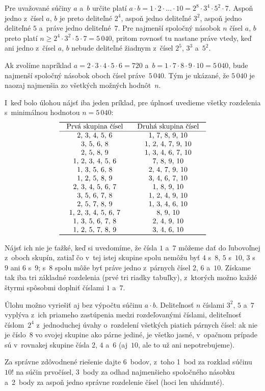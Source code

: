 {%
Pre uvažované súčiny $a$ a~$b$ určite platí $a\cdot b=1\cdot2\cdot\dots\cdot10
= 2^8\cdot3^4\cdot5^2\cdot7$. Aspoň
jedno z~čísel $a$, $b$ je preto deliteľné $2^4$, aspoň jedno deliteľné
$3^2$, aspoň jedno deliteľné $5$ a~práve jedno deliteľné~$7$. Pre najmenší
spoločný násobok $n$ čísel $a$, $b$ preto platí $n\ge2^4\cdot3^2\cdot5\cdot7 = 5\,040$,
pritom rovnosť tu nastane práve vtedy, keď ani jedno z~čísel
$a$, $b$ nebude deliteľné žiadnym z~čísel $2^5$, $3^3$ a~$5^2$.

Ak zvolíme napríklad $a = 2\cdot3\cdot4\cdot5\cdot6 = 720$
a~$b = 1\cdot7\cdot8\cdot9\cdot10 = 5\,040$, bude najmenší spoločný násobok oboch
čísel práve~$5\,040$.
Tým je ukázané, že $5\,040$ je naozaj najmenšia zo všetkých možných hodnôt~$n$.

I~keď bolo úlohou nájsť iba jeden príklad, pre úplnosť uvedieme všetky
rozdelenia s~minimálnou hodnotou $n=5\,040$:
$$
\vbox{\let\\=\cr
\halign{&\quad\hss\strut#\unskip\hss\quad\cr \noalign{\hrule height.8pt}
Prvá skupina čísel & Druhá skupina čísel \\ \noalign{\hrule height.4pt}
2, 3, 4, 5, 6 & 1, 7, 8, 9, 10 \\
3, 5, 6, 8 & 1, 2, 4, 7, 9, 10 \\
2, 5, 8, 9 & 1, 3, 4, 6, 7, 10 \\
1, 2, 3, 4, 5, 6 & 7, 8, 9, 10 \\
1, 3, 5, 6, 8 & 2, 4, 7, 9, 10 \\
1, 2, 5, 8, 9 & 3, 4, 6, 7, 10 \\
%
2, 3, 4, 5, 6, 7 & 1, 8, 9, 10 \\
3, 5, 6, 7, 8 & 1, 2, 4, 9, 10 \\
2, 5, 7, 8, 9 & 1, 3, 4, 6, 10 \\
1, 2, 3, 4, 5, 6, 7 & 8, 9, 10 \\
1, 3, 5, 6, 7, 8 & 2, 4, 9, 10 \\
1, 2, 5, 7, 8, 9 & 3, 4, 6, 10 \\ \noalign{\hrule height.8pt}
}}
$$

Nájsť ich nie je ťažké, keď si uvedomíme, že čísla $1$ a~$7$ môžeme dať do ľubovoľnej
z~oboch skupín, zatiaľ čo v~tej istej skupine spolu nemôžu byť $4$ s~$8$, $5$ s~$10$,
$3$ s~$9$ ani $6$ s~$9$; s~$8$ spolu môže byť práve jedno z~párnych čísel $2$, $6$ a~$10$. Získame
tak iba tri základné rozdelenia (prvé tri riadky tabuľky), z~ktorých možno
každé štyrmi spôsobmi doplniť číslami $1$ a~$7$.

\poznamka
Úlohu možno vyriešiť aj bez výpočtu súčinu $a\cdot b$. Deliteľnosť
$n$ číslami $3^2$, $5$ a~$7$ vyplýva z~ich priameho zastúpenia medzi
rozdeľovanými číslami, deliteľnosť číslom~$2^4$ z~jednoduchej úvahy o~rozdelení
všetkých piatich párnych čísel: ak nie je číslo~$8$ vo svojej skupine ako párne jediné,
je všetko jasné, v~opačnom prípade sú v~rovnakej skupine čísla $2$, $4$ a~$6$
(aj~$10$, ale to už ani nepotrebujeme).

\nobreak\medskip\petit\noindent
Za správne zdôvodnené riešenie dajte 6~bodov, z~toho 1~bod za rozklad
súčinu $10!$ na súčin prvočísel, 3~body za odhad najmenšieho spoločného
násobku a~2~body za aspoň jedno správne rozdelenie čísel (hoci len uhádnuté).
\endpetit
\bigbreak
}

